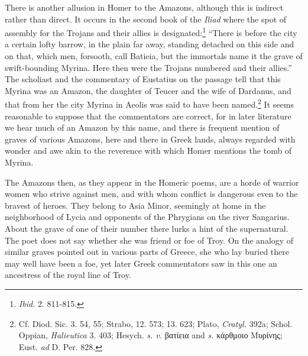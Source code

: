\documentclass[a4paper, 12pt, oneside]{article}
\begin{document}
There is another allusion in Homer to the Amazons, although this is indirect rather than direct. It occurs in the second book of the \emph{Iliad} where the spot of assembly for the Trojans and their allies is designated:\footnote{\emph{Ibid.} 2. 811-815.} ``There is before the city a certain lofty barrow, in the plain far away, standing detached on this side and on that, which men, forsooth, call Batieia, but the immortals name it the grave of swift-bounding Myrina. Here then were the Trojans numbered and their allies.'' The scholiast and the commentary of Eustatius on the passage tell that this Myrina was an Amazon, the daughter of Teucer and the wife of Dardanus, and that from her the city Myrina in Aeolis was said to have been named.\footnote{Cf. Diod. Sic. 3. 54, 55; Strabo, 12. 573; 13. 623; Plato, \emph{Cratyl.} 392a; Schol. Oppian, \emph{Halieutica} 3. 403; Hesych. \emph{s. v.} βατίεια and \emph{s.} κάρθμοιο Μυρίνης; Eust. \emph{ad} D. Per. 828.} It seems reasonable to suppose that the commentators are correct, for in later literature we hear much of an Amazon by this name, and there is frequent mention of graves of various Amazons, here and there in Greek lands, always regarded with wonder and awe akin to the reverence with which Homer mentions the tomb of Myrina.

The Amazons then, as they appear in the Homeric poems, are a horde of warrior women who strive against men, and with whom conflict is dangerous even to the bravest of heroes. They belong to Asia Minor, seemingly at home in the neighborhood of Lycia and opponents of the Phrygians on the river Sangarius. About the grave of one of their number there lurks a hint of the supernatural. The poet does not say whether she was friend or foe of Troy. On the analogy of similar graves pointed out in various parts of Greece, she who lay buried there may well have been a foe, yet later Greek commentators saw in this one an ancestress of the royal line of Troy.
\end{document}
